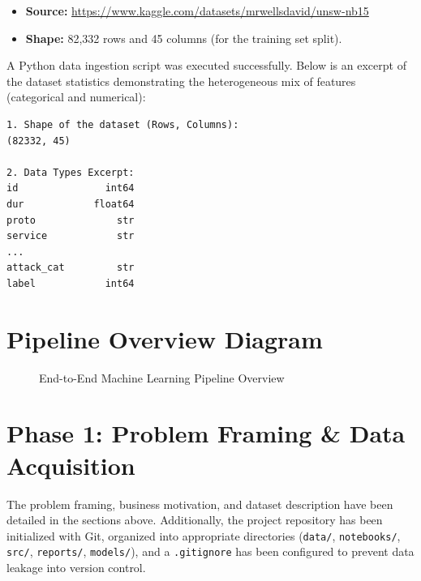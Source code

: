 \documentclass[12pt, a4paper]{article}
\begin{document}
\begin{itemize}
    \item \textbf{Source:} \url{https://www.kaggle.com/datasets/mrwellsdavid/unsw-nb15}
    \item \textbf{Shape:} 82,332 rows and 45 columns (for the training set split).
\end{itemize}

A Python data ingestion script was executed successfully. Below is an excerpt of the dataset statistics demonstrating the heterogeneous mix of features (categorical and numerical):

\begin{verbatim}
1. Shape of the dataset (Rows, Columns):
(82332, 45)

2. Data Types Excerpt:
id               int64
dur            float64
proto              str
service            str
...
attack_cat         str
label            int64
\end{verbatim}

\section{Pipeline Overview Diagram}
\begin{figure}[H]
\centering
{}
\caption{End-to-End Machine Learning Pipeline Overview}
\label{fig:pipeline}
\end{figure}

\section{Phase 1: Problem Framing \& Data Acquisition}
The problem framing, business motivation, and dataset description have been detailed in the sections above. Additionally, the project repository has been initialized with Git, organized into appropriate directories (\texttt{data/}, \texttt{notebooks/}, \texttt{src/}, \texttt{reports/}, \texttt{models/}), and a \texttt{.gitignore} has been configured to prevent data leakage into version control.
\end{document}
